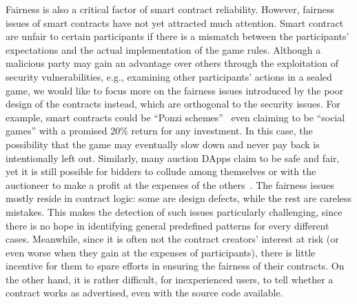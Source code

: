 Fairness is also a critical factor of smart contract reliability. 
However, fairness issues of smart contracts have not yet attracted much attention.
Smart contract are unfair to certain participants if there is a mismatch between the participants' expectations and the actual implementation of the game rules.
Although a malicious party may gain an advantage over others through the exploitation of security vulnerabilities, e.g., examining other participants' actions in a sealed game,
we would like to focus more on the fairness issues introduced by the poor design of the contracts instead, which are orthogonal to the security issues.
For example, smart contracts could be ``Ponzi schemes''~\cite{BARTOLETTI2020259} even claiming to be ``social games'' with a promised 20\% return for any investment.
In this case, the possibility that the game may eventually slow down and never pay back is intentionally left out.
Similarly, many auction DApps claim to be safe and fair, yet it is still possible for bidders to collude among themselves or with the auctioneer to make a profit at the expenses of the others~\cite{wu2018cream}.
The fairness issues mostly reside in contract logic: some are design defects, while the rest are careless mistakes.
This makes the detection of such issues particularly challenging, since there is no hope in identifying general predefined patterns for every different cases.
Meanwhile, since it is often not the contract creators' interest at risk (or even worse when they gain at the expenses of participants), there is little incentive for them to spare efforts in ensuring the fairness of their contracts.
On the other hand, it is rather difficult, for inexperienced users, to tell whether a contract works as advertised, even with the source code available.



